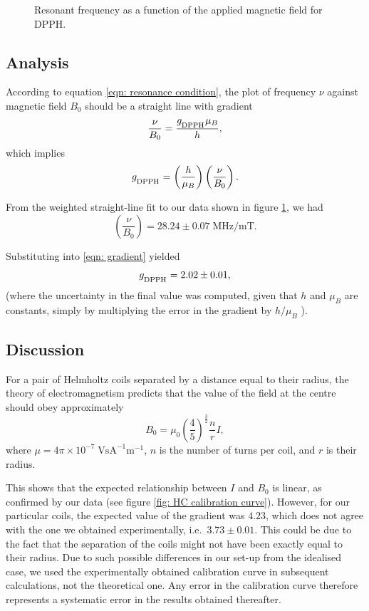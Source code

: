 \documentclass[a4paper]{jpconf}
\numberwithin{equation}{section}
\begin{document}
\begin{figure}[htbp]
\begin{minipage}[b]{3in}
		\caption{Resonant frequency as a function of the applied magnetic field for DPPH.}
		\label{fig: DPPH resonance}
	\end{minipage}
\end{figure}

\subsection{Analysis}
According to equation \eqref{eqn: resonance condition}, the plot of frequency $\nu$ against magnetic field $B_0$ should be a straight line with gradient 
\[
	\frac{\nu}{B_0} = \frac{g_{\textsubscript{DPPH}} \mu_B}{h},
\]
which implies
\begin{equation} \label{eqn: gradient}
	g_{\textsubscript{DPPH}} = \left(\frac{h}{\mu_B}\right) \left(\frac{\nu}{B_0}\right). 
\end{equation}
	
From the weighted straight-line fit to our data shown in figure \ref{fig: DPPH resonance}, we had
\[
	\left(\frac{\nu}{B_0}\right) = 28.24 \pm 0.07 \; \si{\mega\hertz\per\milli\tesla}.
\]

Substituting into \eqref{eqn: gradient} yielded
\[
	g_{\textsubscript{DPPH}} = 2.02 \pm 0.01,
\] 
(where the uncertainty in the final value was computed, given that $h$ and $\mu_B$ are constants, simply by multiplying the error in the gradient by $h / \mu_B$ ).

\subsection{Discussion}
For a pair of Helmholtz coils separated by a distance equal to their radius, the theory of electromagnetism predicts that the value of the field at the centre should obey approximately
\[
	B_0 = \mu_0 \left(\frac45\right)^{\tfrac32} \frac{n}{r} I,
\]
where $\mu = 4\pi\times10^{-7} \; \si{\volt\s\ampere\tothe{-1}\meter\tothe{-1}}$, $n$ is the number of turns per coil, and $r$ is their radius.

This shows that the expected relationship between $I$ and $B_0$ is linear, as confirmed by our data (see figure \ref{fig: HC calibration curve}).
However, for our particular coils, the expected value of the gradient was $4.23$, which does not agree with the one we obtained experimentally, i.e.\ $3.73 \pm 0.01$. This could be due to the fact that the separation of the coils might not have been exactly equal to their radius. Due to such possible differences in our set-up from the idealised case, we used the experimentally obtained calibration curve in subsequent calculations, not the theoretical one. Any error in the calibration curve therefore represents a systematic error in the results obtained thereafter.
\end{document}
